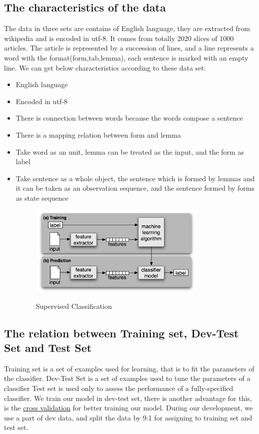 \documentclass[a4paper]{article}
\begin{document}
\subsection{The characteristics of the data}
The data in three sets are contains of English language, they are extracted from wikipedia and is encoded in utf-8. It comes from totally 2020 slices of 1000 articles. The article is represented by a succession of lines, and a line represents a word with the format(form,tab,lemma), each sentence is marked with an empty line. We can get below characteristics according to these data set:
\begin{itemize}
\item English language
\item Encoded in utf-8
\item There is connection between words because the words compose a sentence
\item There is a mapping relation between form and lemma
\item Take word as an unit, lemma can be treated as the input, and the form as label
\item Take sentence as a whole object, the sentence which is formed by lemmas and it can be taken as an observation sequence, and the sentence formed by forms as state sequence

\begin{figure}[H]  
\centering
\includegraphics[width=0.8\textwidth]{process_flow.png}
\caption{Supervised Classification\protect\footnotemark}  
\cite{bird_natural_2009}
\end{figure}

\end{itemize}

\subsection{The relation between Training set, Dev-Test Set and Test Set}
Training set is a set of examples used for learning, that is to fit the parameters of the classifier. Dev-Test Set is a set of examples used to tune the parameters of a classifier Test set is used only to assess the performance of a fully-specified classifier.\cite{ripley_pattern_2007} We train our model in dev-test set, there is another advantage for this, is the \href{https://en.wikipedia.org/wiki/Cross-validation_(statistics)}{cross validation} for better training our model. During our development, we use a part of dev data, and split the data by 9:1 for assigning to training set and test set.
\end{document}
